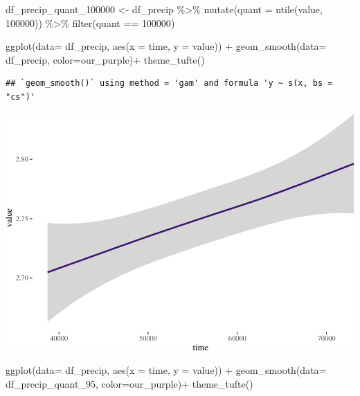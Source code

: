 \documentclass[
  paper=a4,
  ,captions=tableheading
]{scrartcl}
\newenvironment{Shaded}{\begin{snugshade}}{\end{snugshade}}
\newcommand{\AttributeTok}[1]{\textcolor[rgb]{0.77,0.63,0.00}{#1}}
\newcommand{\DecValTok}[1]{\textcolor[rgb]{0.00,0.00,0.81}{#1}}
\newcommand{\FunctionTok}[1]{\textcolor[rgb]{0.00,0.00,0.00}{#1}}
\newcommand{\NormalTok}[1]{#1}
\newcommand{\OtherTok}[1]{\textcolor[rgb]{0.56,0.35,0.01}{#1}}
\newcommand{\SpecialCharTok}[1]{\textcolor[rgb]{0.00,0.00,0.00}{#1}}
\begin{document}
\begin{Shaded}
\begin{Highlighting}[]
\NormalTok{df\_precip\_quant\_100000 }\OtherTok{\textless{}{-}}\NormalTok{ df\_precip }\SpecialCharTok{\%\textgreater{}\%} 
  \FunctionTok{mutate}\NormalTok{(}\AttributeTok{quant =} \FunctionTok{ntile}\NormalTok{(value, }\DecValTok{100000}\NormalTok{)) }\SpecialCharTok{\%\textgreater{}\%}
  \FunctionTok{filter}\NormalTok{(quant }\SpecialCharTok{==} \DecValTok{100000}\NormalTok{)}
\end{Highlighting}
\end{Shaded}

\begin{Shaded}
\begin{Highlighting}[]
\FunctionTok{ggplot}\NormalTok{(}\AttributeTok{data=}\NormalTok{ df\_precip, }\FunctionTok{aes}\NormalTok{(}\AttributeTok{x =}\NormalTok{ time, }\AttributeTok{y =}\NormalTok{ value)) }\SpecialCharTok{+} 
     \FunctionTok{geom\_smooth}\NormalTok{(}\AttributeTok{data=}\NormalTok{ df\_precip, }\AttributeTok{color=}\NormalTok{our\_purple)}\SpecialCharTok{+}
  \FunctionTok{theme\_tufte}\NormalTok{()}
\end{Highlighting}
\end{Shaded}

\begin{verbatim}
## `geom_smooth()` using method = 'gam' and formula 'y ~ s(x, bs = "cs")'
\end{verbatim}

\includegraphics{Haskell_files/figure-latex/unnamed-chunk-49-1.pdf}

\begin{Shaded}
\begin{Highlighting}[]
\FunctionTok{ggplot}\NormalTok{(}\AttributeTok{data=}\NormalTok{ df\_precip, }\FunctionTok{aes}\NormalTok{(}\AttributeTok{x =}\NormalTok{ time, }\AttributeTok{y =}\NormalTok{ value)) }\SpecialCharTok{+} 
     \FunctionTok{geom\_smooth}\NormalTok{(}\AttributeTok{data=}\NormalTok{ df\_precip\_quant\_95, }\AttributeTok{color=}\NormalTok{our\_purple)}\SpecialCharTok{+}
  \FunctionTok{theme\_tufte}\NormalTok{()}
\end{Highlighting}
\end{Shaded}
\end{document}
